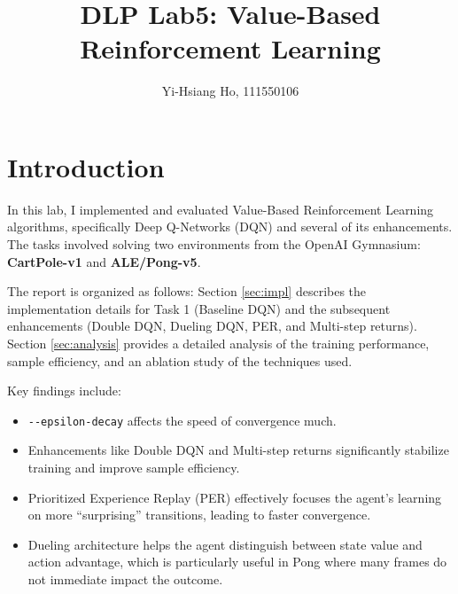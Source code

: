 \documentclass[10pt,twocolumn,letterpaper]{article}
\begin{document}
\title{DLP Lab5: Value-Based Reinforcement Learning}

\author{Yi-Hsiang Ho, 111550106
}
\maketitle


\section{Introduction}
\label{sec:intro}

In this lab, I implemented and evaluated Value-Based Reinforcement Learning
algorithms, specifically Deep Q-Networks (DQN) and several of its enhancements.
The tasks involved solving two environments from the OpenAI Gymnasium: \textbf{
CartPole-v1} and \textbf{ALE/Pong-v5}.

The report is organized as follows: Section \ref{sec:impl} describes the
implementation details for Task 1 (Baseline DQN) and the subsequent enhancements
(Double DQN, Dueling DQN, PER, and Multi-step returns). Section \ref{sec:analysis}
provides a detailed analysis of the training performance, sample efficiency, and an
ablation study of the techniques used.

Key findings include:
\begin{itemize}[itemsep=-3pt]
  \item \verb|--epsilon-decay| affects the speed of convergence much.
  \item Enhancements like Double DQN and Multi-step returns significantly stabilize
    training and improve sample efficiency.
  \item Prioritized Experience Replay (PER) effectively focuses the agent's
    learning on more ``surprising'' transitions, leading to faster convergence.
  \item Dueling architecture helps the agent distinguish between state value and
    action advantage, which is particularly useful in Pong where many frames do not
    immediate impact the outcome.
\end{itemize}
\end{document}
